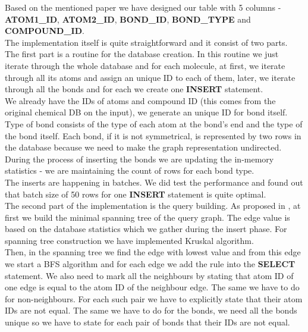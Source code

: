 {Based on the mentioned paper we have designed our table with 5 columns - \textbf{ATOM1\_ID}, \textbf{ATOM2\_ID}, \textbf{BOND\_ID}, \textbf{BOND\_TYPE} and \break \textbf{COMPOUND\_ID}.\\


The implementation itself is quite straightforward and it consist of two parts. The first part is a routine for the database creation. In this routine we just iterate through the whole database and for each molecule, at first, we iterate through all its atoms and assign an unique ID to each of them, later, we iterate through all the bonds and for each we create one \textbf{INSERT} statement.\\

We already have the IDs of atoms and compound ID (this comes from the original chemical DB on the input), we generate an unique ID for bond itself. Type of bond consists of the type of each atom at the bond's end and the type of the bond itself. Each bond, if it is not symmetrical, is represented by two rows in the database because we need to make the graph representation undirected. During the process of inserting the bonds we are updating the in-memory statistics - we are maintaining the count of rows for each bond type.\\

The inserts are happening in batches. We did test the performance and found out that batch size of 50 rows for one \textbf{INSERT} statement is quite optimal.\\

The second part of the implementation is the query building. As proposed in \cite{SQL}, at first we build the minimal spanning tree of the query graph. The edge value is based on the database statistics which we gather during the insert phase. For spanning tree construction we have implemented Kruskal algorithm.\\

Then, in the spanning tree we find the edge with lowest value and from this edge we start a BFS algorithm and for each edge we add the rule into the \textbf{SELECT} statement. We also need to mark all the neighbours by stating that atom ID of one edge is equal to the atom ID of the neighbour edge. The same we have to do for non-neighbours. For each such pair we have to explicitly state that their atom IDs are not equal. The same we have to do for the bonds, we need all the bonds unique so we have to state for each pair of bonds that their IDs are not equal.\\

}
